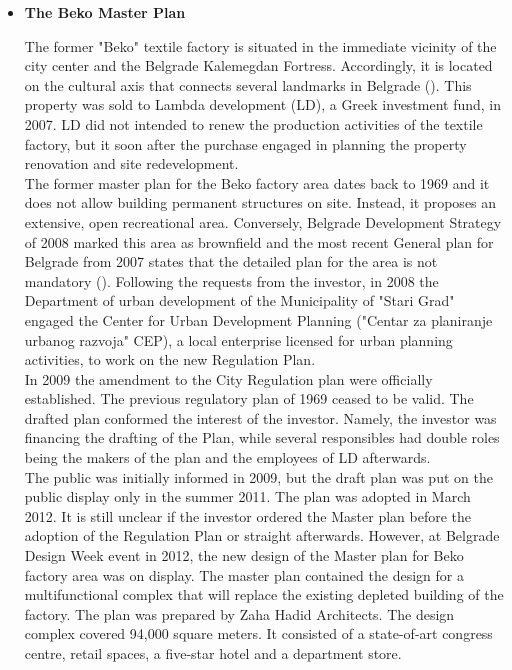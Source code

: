 \documentclass[11pt]{report}
\begin{document}
\begin{itemize}
\item \textbf{The Beko Master Plan}

The former "Beko" textile factory is situated in the immediate vicinity of the city center and the Belgrade Kalemegdan Fortress. Accordingly, it is located on the cultural axis that connects several landmarks in Belgrade (\cite{Vukmirovic in Doytchinov et al 2015}). 
This property was sold to Lambda development (LD), a Greek investment fund, in 2007.
LD did not intended to renew the production activities of the textile factory, but it soon after the purchase engaged in planning the property renovation and site redevelopment.
\\
The former master plan for the Beko factory area dates back to 1969 and it does not allow building permanent structures on site. Instead, it proposes an extensive, open recreational area.
Conversely, Belgrade Development Strategy of 2008 marked this area as brownfield and the most recent General plan for Belgrade from 2007 states that the detailed plan for the area is not mandatory (\cite{Vukmirovic in Doytchinov et al 2015}).
Following the requests from the investor, in 2008 the Department of urban development of the Municipality of "Stari Grad" engaged the Center for Urban Development Planning ("Centar za planiranje urbanog razvoja" CEP), a local enterprise licensed for urban planning activities, to work on the new Regulation Plan.
\\
In 2009 the amendment to the City Regulation plan were officially established.
The previous regulatory plan of 1969 ceased to be valid. The drafted plan conformed the interest of the investor. Namely, the investor was financing the drafting of the Plan, while several responsibles had double roles being the makers of the plan and the employees of LD afterwards.
\\
The public was initially informed in 2009, but the draft plan was put on the public display only in the summer 2011. The plan was adopted in March 2012. 
It is still unclear if the investor ordered the Master plan before the adoption of the Regulation Plan or straight afterwards.
However, at Belgrade Design Week event in 2012, the new design of the Master plan for Beko factory area was on display.
The master plan contained the design for a multifunctional complex that will replace the existing depleted building of the factory.
The plan was prepared by Zaha Hadid Architects. The design complex covered 94,000 square meters. It consisted of a  state-of-art congress  centre,  retail  spaces, a five-star hotel and a department store.

\end{itemize}
\end{document}
